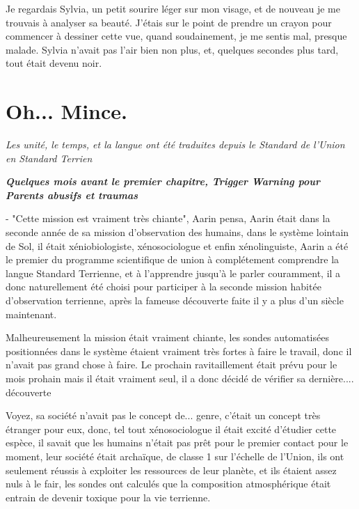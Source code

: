 \documentclass[12pt,colorlinks,a4paper]{book}
\begin{document}
Je regardais Sylvia, un petit sourire léger sur mon visage, et de
nouveau je me trouvais à analyser sa beauté. J'étais sur le point
de prendre un crayon pour commencer à dessiner cette vue, quand soudainement,
je me sentis mal, presque malade. Sylvia n'avait pas l'air bien non
plus, et, quelques secondes plus tard, tout était devenu noir.



\chapter{Oh... Mince.}

\textit{Les unité, le temps, et la langue ont été traduites depuis le Standard de l'Union en Standard Terrien}\par
\textit{\textbf{Quelques mois avant le premier chapitre, Trigger Warning pour Parents abusifs et traumas}}\par
\bigskip
- "Cette mission est vraiment très chiante", Aarin pensa, 
Aarin était dans la seconde année de sa mission d'observation des humains, dans le système lointain de Sol,
il était xéniobiologiste, xénosociologue et enfin xénolinguiste, 
Aarin a été le premier du programme scientifique de \gls{union} à complétement comprendre 
la langue Standard Terrienne, et à l'apprendre jusqu'à le parler couramment,
il a donc naturellement été choisi pour participer à la seconde mission habitée d'observation terrienne,
après la fameuse découverte faite il y a plus d'un siècle maintenant.\par
\bigskip

Malheureusement la mission était vraiment chiante, les sondes automatisées positionnées dans le système étaient vraiment
très fortes à faire le travail, donc il n'avait pas grand chose à faire. Le prochain ravitaillement était 
prévu pour le mois prohain mais il était vraiment seul, il a donc décidé de vérifier sa dernière.... découverte\par
\bigskip

Voyez, sa société n'avait pas le concept de... genre, c'était un concept très étranger pour eux, donc, 
tel tout xénosociologue il était excité d'étudier cette espèce, il savait que les humains n'était pas 
prêt pour le premier contact pour le moment, leur société était archaïque, de classe 1 sur l'échelle de l'Union, 
ils ont seulement réussis à exploiter les ressources de leur planète, et ils étaient assez nuls à le fair, les sondes 
ont calculés que la composition atmosphérique était entrain de devenir toxique pour la vie terrienne.\par 
\bigskip
\end{document}
